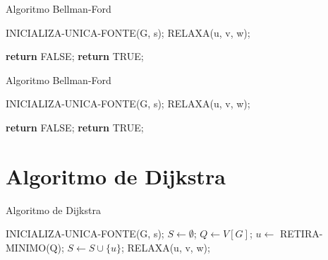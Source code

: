 \documentclass{beamer}
\begin{document}
	
	\begin{frame}{Algoritmo Bellman-Ford}
		\begin{algorithm}[H]
			\caption{Bellman-Ford}\label{alg:d}
			\begin{algorithmic}[1]
				\State INICIALIZA-UNICA-FONTE(G, s);
				   
				   
				\State RELAXA(u, v, w);   
				\EndFor
				\EndFor
				
				 
				\State \textbf{return} FALSE;
				\EndIf
				\EndFor
				\State \textbf{return} TRUE;
				\EndProcedure
			\end{algorithmic}
		\end{algorithm}
	\end{frame}
	
	\begin{frame}{Algoritmo Bellman-Ford}
		\begin{algorithm}[H]
			\caption{Bellman-Ford}\label{alg:d}
			\begin{algorithmic}[1]
				\State INICIALIZA-UNICA-FONTE(G, s);
				   
				   
				\State RELAXA(u, v, w);   
				\EndFor
				\EndFor
				
				 
				   
				\State \textbf{return} FALSE;
				\EndIf
				\EndFor
				\State \textbf{return} TRUE;
				\EndProcedure
			\end{algorithmic}
		\end{algorithm}
	\end{frame}
	
\section{Algoritmo de Dijkstra}
	\begin{frame}{Algoritmo de Dijkstra}
		\begin{algorithm}[H]
			\caption{Dijkstra}\label{alg:d}
			\begin{algorithmic}[1]
				\State INICIALIZA-UNICA-FONTE(G, s);
				\State $S\gets \emptyset$;
				\State $Q\gets V[G]$;
				\State $u\gets$ RETIRA-MINIMO(Q);
				\State $S\gets S \cup \{u\}$;
				\State RELAXA(u, v, w);
				\EndFor
				\EndWhile\label{euclidendwhile}
				\EndProcedure
			\end{algorithmic}
		\end{algorithm}
	\end{frame}
	
\end{document}
